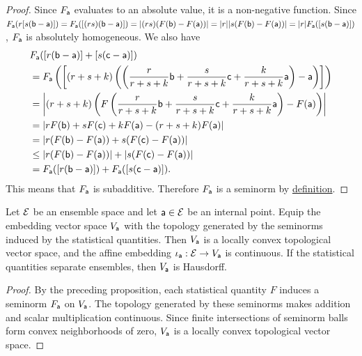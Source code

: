 \begin{mathSection}
\begin{proof}
	Since $F_{\ens[a]}$ evaluates to an absolute value, it is a non-negative function. Since $F_{\ens[a]}(r[s(\ens[b]-\ens[a])]) = F_{\ens[a]}([(rs)(\ens[b]-\ens[a])]) = |(rs) (F(\ens[b]) - F(\ens[a]))| = |r| |s (F(\ens[b]) - F(\ens[a]))| = |r| F_{\ens[a]}([s(\ens[b]-\ens[a])])$, $F_{\ens[a]}$ is absolutely homogeneous. We also have
	\begin{equation}
	\begin{aligned}
		&F_{\ens[a]}([r(\ens[b]-\ens[a])] + [s(\ens[c]-\ens[a])])  \\
		&= F_{\ens[a]}\left(\left[(r+s+k) \left(\left(\frac{r}{r+s+k}\ens[b] + \frac{s}{r+s+k} \ens[c] +\frac{k}{r+s+k} \ens[a] \right) - \ens[a]\right)\right]\right) \\
		&= \left|(r+s+k)\left(F\left(\frac{r}{r+s+k}\ens[b] + \frac{s}{r+s+k} \ens[c] +\frac{k}{r+s+k} \ens[a]\right) - F(\ens[a]) \right)\right| \\
		&= \left|r F(\ens[b]) + s F(\ens[c]) + k F(\ens[a]) - (r+s+k) F(\ens[a]) \right| \\
		&= \left|r ( F(\ens[b]) - F(\ens[a]))  + s ( F(\ens[c]) - F(\ens[a])) \right| \\
		&\leq \left| r ( F(\ens[b]) - F(\ens[a])) \right| + \left| s ( F(\ens[c]) - F(\ens[a])) \right| \\
		&= F_{\ens[a]}([r(\ens[b]-\ens[a])]) + F_{\ens[a]}([s(\ens[c]-\ens[a])]).
	\end{aligned}
	\end{equation}
	This means that $F_{\ens[a]}$ is subadditive. Therefore $F_{\ens[a]}$ is a seminorm by \href{https://en.wikipedia.org/wiki/Seminorm}{definition}.
\end{proof}

\begin{prop}
	Let $\Ens$ be an ensemble space and let $\ens[a]\in\Ens$ be an internal point. Equip the embedding vector space $V_{\ens[a]}$ with the topology generated by the seminorms induced by the statistical quantities. Then $V_{\ens[a]}$ is a locally convex topological vector space, and the affine embedding $\iota_{\ens[a]}:\Ens\to V_{\ens[a]}$ is continuous. If the statistical quantities separate ensembles, then $V_{\ens[a]}$ is Hausdorff.
\end{prop}
\begin{proof}
	By the preceding proposition, each statistical quantity $F$ induces a seminorm $F_{\ens[a]}$ on $V_{\ens[a]}$. The topology generated by these seminorms makes addition and scalar multiplication continuous. Since finite intersections of seminorm balls form convex neighborhoods of zero, $V_{\ens[a]}$ is a locally convex topological vector space.
	

\end{proof}
\end{mathSection}
